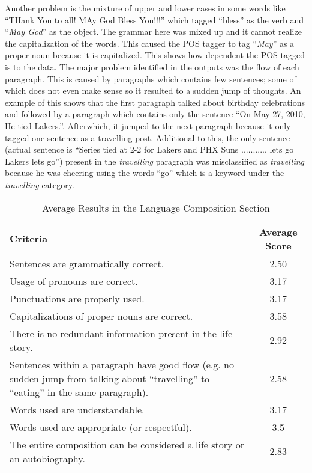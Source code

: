 Another problem is the mixture of upper and lower cases in some words like “THank You to all! MAy God Bless You!!!” which tagged “bless” as the verb and “\textit{May God}” as the object. The grammar here was mixed up and it cannot realize the capitalization of the words. This caused the POS tagger to tag “\textit{May}” as a proper noun because it is capitalized. This shows how dependent the POS tagged is to the data.
The major problem identified in the outputs was the flow of each paragraph. This is caused by paragraphs which contains few sentences; some of which does not even make sense so it resulted to a sudden jump of thoughts. An example of this shows that the first paragraph talked about birthday celebrations and followed by a paragraph which contains only the sentence “On May 27, 2010, He tied Lakers.”. Afterwhich, it jumped to the next paragraph because it only tagged one sentence as a travelling post.  Additional to this, the only sentence (actual sentence is “Series tied at 2-2 for Lakers and PHX Suns ........... lets go Lakers lets go”) present in the \textit{travelling} paragraph was misclassified as \textit{travelling} because he was cheering using the words “go” which is a keyword under the \textit{travelling} category.

\begin{table}[ph!]   %
	\centering
	\caption{Average Results in the Language Composition Section} \vspace{0.25em}
	\begin{tabular}{|p{2.5in}|c|} \hline
		\centering Criteria & Average Score \\ \hline
		Sentences are grammatically correct. & 2.50 \\ \hline 
		Usage of pronouns are correct. & 3.17 \\ \hline
		Punctuations are properly used. & 3.17 \\ \hline
		Capitalizations of proper nouns are correct. & 3.58 \\ \hline
		There is no redundant information present in the life story. & 2.92 \\ \hline
		Sentences within a paragraph have good flow (e.g. no sudden jump from talking about “travelling” to “eating” in the same paragraph). & 2.58 \\ \hline
		Words used are understandable. & 3.17 \\ \hline
		Words used are appropriate (or respectful). & 3.5 \\ \hline
		The entire composition can be considered a life story or an autobiography. & 2.83 \\ \hline
	\end{tabular}
	\label{tab:criteria1}
\end{table}

